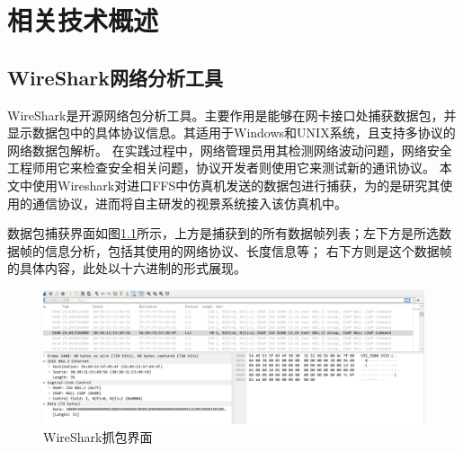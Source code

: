 \chapter{相关技术概述}
\section{WireShark网络分析工具}
WireShark是开源网络包分析工具。主要作用是能够在网卡接口处捕获数据包，并显示数据包中的具体协议信息\cite{wireshark1}。其适用于Windows和UNIX系统，且支持多协议的网络数据包解析。
在实践过程中，网络管理员用其检测网络波动问题，网络安全工程师用它来检查安全相关问题，协议开发者则使用它来测试新的通讯协议\cite{wireshark2}。
本文中使用Wireshark对进口FFS中仿真机发送的数据包进行捕获，为的是研究其使用的通信协议，进而将自主研发的视景系统接入该仿真机中。
\par
数据包捕获界面如图\ref{wireshark}所示，上方是捕获到的所有数据帧列表；左下方是所选数据帧的信息分析，包括其使用的网络协议、长度信息等；
右下方则是这个数据帧的具体内容，此处以十六进制的形式展现。
\begin{figure}[h!]
    \begin{center}
        \includegraphics[width=\textwidth]{pictures/wireshark.png}
        \caption{WireShark抓包界面}
        \label{wireshark}
    \end{center}
\end{figure}
